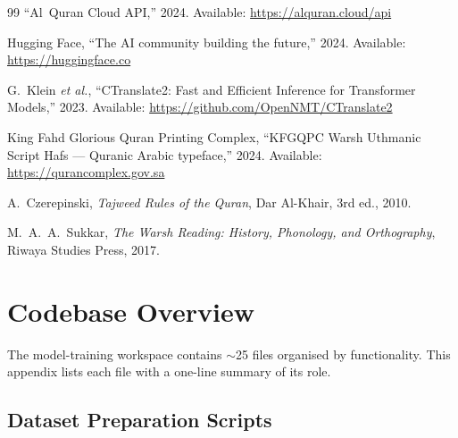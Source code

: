 \documentclass[12pt,a4paper]{report}
\begin{document}
\begin{thebibliography}{99}
``Al~Quran Cloud API,'' 2024.
Available: \url{https://alquran.cloud/api}

Hugging Face,
``The AI community building the future,'' 2024.
Available: \url{https://huggingface.co}

G.~Klein \textit{et al.},
``CTranslate2: Fast and Efficient Inference for Transformer Models,''
2023. Available: \url{https://github.com/OpenNMT/CTranslate2}

King Fahd Glorious Quran Printing Complex,
``KFGQPC Warsh Uthmanic Script Hafs --- Quranic Arabic typeface,''
2024. Available: \url{https://qurancomplex.gov.sa}

A.~Czerepinski,
\textit{Tajweed Rules of the Quran},
Dar Al-Khair, 3rd ed., 2010.

M.~A.~A.~Sukkar,
\textit{The Warsh Reading: History, Phonology, and Orthography},
Riwaya Studies Press, 2017.

\end{thebibliography}

\appendix

\chapter{Codebase Overview}
\label{app:mt_codebase}

The model-training workspace contains $\sim$25 files organised by
functionality. This appendix lists each file with a one-line summary of
its role.

\section{Dataset Preparation Scripts}
\end{document}
